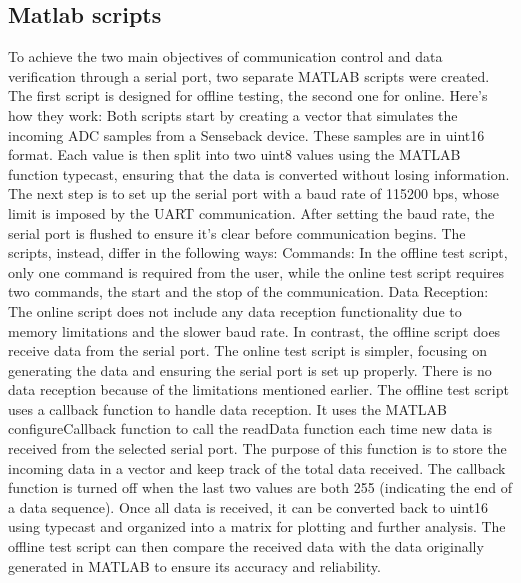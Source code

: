 \documentclass{Configuration_Files/PoliMi3i_thesis}
\begin{document}
\subsection{Matlab scripts}

To achieve the two main objectives of communication control and data verification through a serial port, two separate MATLAB scripts were created. The first script is designed for offline testing, the second one for online. Here's how they work:
Both scripts start by creating a vector that simulates the incoming ADC samples from a Senseback device. These samples are in uint16 format. Each value is then split into two uint8 values using the MATLAB function typecast, ensuring that the data is converted without losing information. The next step is to set up the serial port with a baud rate of 115200 bps, whose limit is imposed by the UART communication. After setting the baud rate, the serial port is flushed to ensure it's clear before communication begins.
The scripts, instead, differ in the following ways:
Commands: In the offline test script, only one command is required from the user, while the online test script requires two commands, the start and the stop of the communication.
Data Reception: The online script does not include any data reception functionality due to memory limitations and the slower baud rate. In contrast, the offline script does receive data from the serial port.
The online test script is simpler, focusing on generating the data and ensuring the serial port is set up properly. There is no data reception because of the limitations mentioned earlier.
The offline test script uses a callback function to handle data reception. It uses the MATLAB configureCallback function to call the readData function each time new data is received from the selected serial port. The purpose of this function is to store the incoming data in a vector and keep track of the total data received. The callback function is turned off when the last two values are both 255 (indicating the end of a data sequence). Once all data is received, it can be converted back to uint16 using typecast and organized into a matrix for plotting and further analysis. The offline test script can then compare the received data with the data originally generated in MATLAB to ensure its accuracy and reliability.
\end{document}
